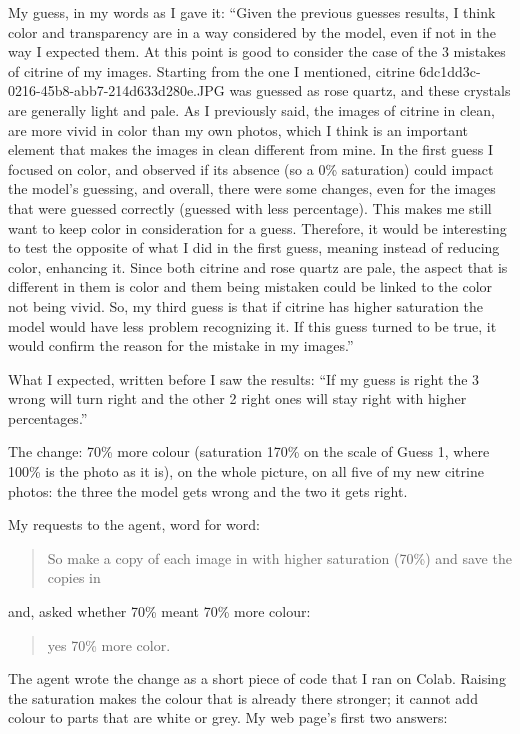 \documentclass[11pt]{article}
\begin{document}
My guess, in my words as I gave it: ``Given the previous guesses results, I
think color and transparency are in a way considered by the model, even if not
in the way I expected them. At this point is good to consider the case of the 3
mistakes of citrine of my images. Starting from the one I mentioned, citrine
6dc1dd3c-0216-45b8-abb7-214d633d280e.JPG was guessed as rose quartz, and these
crystals are generally light and pale. As I previously said, the images of
citrine in clean, are more vivid in color than my own photos, which I think is
an important element that makes the images in clean different from mine. In the
first guess I focused on color, and observed if its absence (so a 0\%
saturation) could impact the model's guessing, and overall, there were some
changes, even for the images that were guessed correctly (guessed with less
percentage). This makes me still want to keep color in consideration for a
guess. Therefore, it would be interesting to test the opposite of what I did in
the first guess, meaning instead of reducing color, enhancing it. Since both
citrine and rose quartz are pale, the aspect that is different in them is color
and them being mistaken could be linked to the color not being vivid. So, my
third guess is that if citrine has higher saturation the model would have less
problem recognizing it. If this guess turned to be true, it would confirm the
reason for the mistake in my images.''

What I expected, written before I saw the results: ``If my guess is right the
3 wrong will turn right and the other 2 right ones will stay right with higher
percentages.''

The change: 70\% more colour (saturation 170\% on the scale of Guess 1, where
100\% is the photo as it is), on the whole picture, on all five of my new
citrine photos: the three the model gets wrong and the two it gets right.

My requests to the agent, word for word:
\begin{quote}
So make a copy of each image in  with higher saturation
(70\%) and save the copies in 
\end{quote}
and, asked whether 70\% meant 70\% more colour:
\begin{quote}
yes 70\% more color.
\end{quote}

The agent wrote the change as a short piece of code that I ran on Colab. Raising
the saturation makes the colour that is already there stronger; it cannot add
colour to parts that are white or grey. My web page's first two answers:
\end{document}
